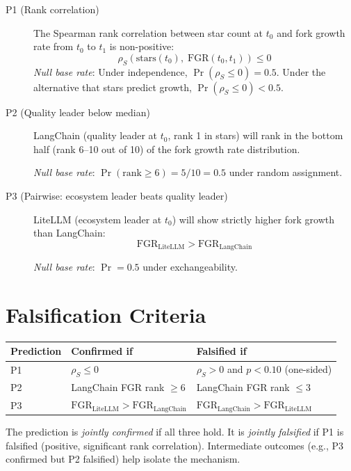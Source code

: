 \documentclass[12pt]{article}
\begin{document}
\begin{description}
\item[P1 (Rank correlation)]
The Spearman rank correlation between star count at $t_0$ and fork growth rate from $t_0$ to $t_1$ is non-positive:
\[\rho_S(\text{stars}(t_0),\; \text{FGR}(t_0, t_1)) \leq 0\]
\emph{Null base rate}: Under independence, $\Pr(\rho_S \leq 0) = 0.5$. Under the alternative that stars predict growth, $\Pr(\rho_S \leq 0) < 0.5$.

\item[P2 (Quality leader below median)]
LangChain (quality leader at $t_0$, rank 1 in stars) will rank in the bottom half (rank 6--10 out of 10) of the fork growth rate distribution.

\emph{Null base rate}: $\Pr(\text{rank} \geq 6) = 5/10 = 0.5$ under random assignment.

\item[P3 (Pairwise: ecosystem leader beats quality leader)]
LiteLLM (ecosystem leader at $t_0$) will show strictly higher fork growth than LangChain:
\[\text{FGR}_{\text{LiteLLM}} > \text{FGR}_{\text{LangChain}}\]

\emph{Null base rate}: $\Pr = 0.5$ under exchangeability.
\end{description}

\section{Falsification Criteria}

\begin{center}
\begin{tabular}{lll}
\toprule
Prediction & Confirmed if & Falsified if \\
\midrule
P1 & $\rho_S \leq 0$ & $\rho_S > 0$ and $p < 0.10$ (one-sided) \\
P2 & LangChain FGR rank $\geq 6$ & LangChain FGR rank $\leq 3$ \\
P3 & $\text{FGR}_{\text{LiteLLM}} > \text{FGR}_{\text{LangChain}}$ & $\text{FGR}_{\text{LangChain}} > \text{FGR}_{\text{LiteLLM}}$ \\
\bottomrule
\end{tabular}
\end{center}

The prediction is \emph{jointly confirmed} if all three hold. It is \emph{jointly falsified} if P1 is falsified (positive, significant rank correlation). Intermediate outcomes (e.g., P3 confirmed but P2 falsified) help isolate the mechanism.
\end{document}
